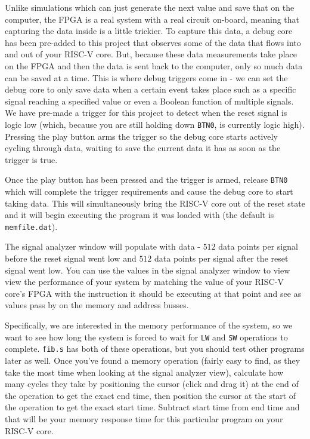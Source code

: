 \documentclass{article}
\begin{document}
\begin{enumerate}
Unlike simulations which can just generate the next value and save that on the
computer, the FPGA is a real system with a real circuit on-board, meaning that
capturing the data inside is a little trickier.  To capture this data, a debug
core has been pre-added to this project that observes some of the data that
flows into and out of your RISC-V core.  But, because these data measurements take
place on the FPGA and then the data is sent back to the computer, only so much
data can be saved at a time.  This is where debug triggers come in - we can set
the debug core to only save data when a certain event takes place such as a
specific signal reaching a specified value or even a Boolean function of
multiple signals.  We have pre-made a trigger for this project to detect when
the reset signal is logic low (which, because you are still holding down
\verb|BTN0|, is currently logic high).  Pressing the play button arms the
trigger so the debug core starts actively cycling through data, waiting to save
the current data it has as soon as the trigger is true.

Once the play button has been pressed and the trigger is armed, release
\verb|BTN0| which will complete the trigger requirements and cause the debug
core to start taking data.  This will simultaneously bring the RISC-V core out of
the reset state and it will begin executing the program it was loaded with (the
default is \verb|memfile.dat|).

The signal analyzer window will populate with data - $512$ data points per signal
before the reset signal went low and $512$ data points per signal after the reset
signal went low.  You can use the values in the signal analyzer window to view
view the performance of your system by matching the value of your RISC-V core's
FPGA with the instruction it should be executing at that point and see as values
pass by on the memory and address busses.

Specifically, we are interested in
the memory performance of the system, so we want to see how long the system is
forced to wait for \verb|LW| and \verb|SW| operations to complete.
\verb|fib.s| has both of these operations, but you should test other
programs later as well.  Once you've found a memory operation (fairly easy to
find, as they take the most time when looking at the signal analyzer view),
calculate how many cycles they take by positioning the cursor (click and drag
it) at the end of the operation to get the exact end time, then position the
cursor at the start of the operation to get the exact start time.  Subtract
start time from end time and that will be your memory response time for this
particular program on your RISC-V core.


\end{enumerate}
\end{document}
